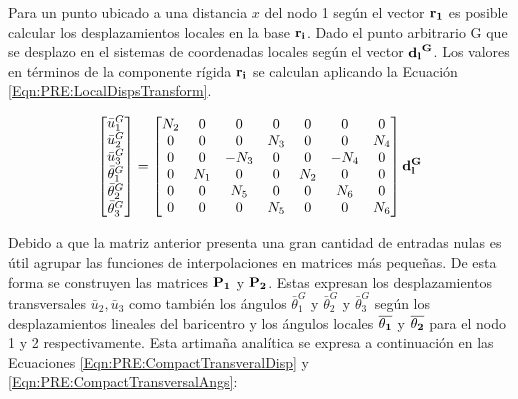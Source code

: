 Para un punto ubicado a una distancia $x$ del nodo 1 según el vector $\bf{r_1}$ es posible calcular los desplazamientos locales en la base $\bf{r_i}$. Dado el punto arbitrario G que se desplazo en el sistemas de coordenadas locales según el vector $\bf{d_l}^G$. Los valores en términos de la componente rígida $\bf{r_i}$ se calculan aplicando la Ecuación \ref{Eqn:PRE:LocalDispsTransform}.

\begin{equation}\label{Eqn:PRE:LocalDispsTransform}
	\begin{bmatrix}
		\bar{u}_1^G\\
		\bar{u}_2^G\\
		\bar{u}_3^G\\
		 \bar{\theta}_1^G\\
		 \bar{\theta}_2^G\\
		 \bar{\theta}_3^G\\
	\end{bmatrix}
=
\begin{bmatrix}
	N_2 &0  & 0 & 0 & 0 & 0 & 0   \\ 
	0 & 0 & 0 & N_3 & 0 &0  &N_4  \\ 
	0& 0 &-N_3  & 0 &0  & -N_4 &0 \\ 
	0 & N_1 & 0 & 0 &N_2  & 0 &0   \\ 
	0&0  & N_5 & 0 & 0 & N_6 &0   \\ 
	0 & 0 & 0 & N_5 & 0 & 0 & N_6   \\
\end{bmatrix} \bf{d_l^G}
\end{equation}

Debido a que la matriz anterior presenta una gran cantidad de entradas nulas es útil agrupar las funciones de interpolaciones en matrices más pequeñas. De esta forma se construyen las matrices $\bf{P_1}$ y $\bf{P_2}$.  Estas expresan los desplazamientos transversales  $\bar{u}_2, \bar{u}_3 $  como también los ángulos $\bar{\theta}_1^G$  y $\bar{\theta}_2^G$ y $\bar{\theta}_3^G$ según los desplazamientos lineales del baricentro y los ángulos locales  $\overline{\bf{\theta_1}}$ y  $\overline{\bf{\theta_2}}$ para el nodo 1 y 2 respectivamente. Esta artimaña analítica se expresa a continuación en las Ecuaciones \eqref{Eqn:PRE:CompactTransveralDisp} y \eqref{Eqn:PRE:CompactTransversalAngs}:

